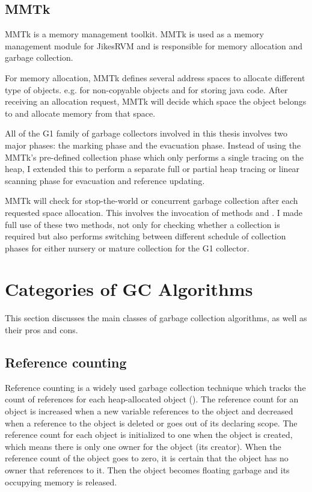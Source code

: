 \subsection{MMTk}

MMTk is a memory management toolkit.
MMTk is used as a memory management module for JikesRVM and is responsible for
memory allocation and garbage collection.

For memory allocation, MMTk defines several address spaces to
allocate different type of objects. e.g.  for non-copyable objects
and  for storing java code. After receiving an allocation request,
MMTk will decide which space the object belongs to and allocate memory from that space.

All of the G1 family of garbage collectors involved in this thesis involves two major phases:
the marking phase and the evacuation phase.
Instead of using the MMTk's pre-defined 
collection phase which only performs a single tracing on the heap, I extended this
to perform a separate full or partial heap tracing or linear scanning phase for
evacuation and reference updating.

MMTk will check for stop-the-world or concurrent garbage collection after each
requested space allocation.
This involves the invocation of methods 
and .
I made full use of these two methods,
not only for checking whether a collection is required but also performs switching between different schedule of collection phases
for either nursery or mature collection for the G1 collector.

\section{Categories of GC Algorithms}
\label{sec:gcalgorithms}

This section discusses the main classes of garbage collection algorithms, as well
as their pros and cons.

\subsection{Reference counting}

Reference counting is a widely used garbage collection technique which tracks the
count of references for each heap-allocated object (\cite{detlefs2002lock}).
The reference count for an object is increased when a new variable references to
the object and decreased when a reference
to the object is deleted or goes out of its declaring scope. The reference count for
each object is initialized to one when the object is created, which means there is only one
owner for the object (its creator). When the reference count of the object goes
to zero, it is certain that the object has no owner that references to it. Then the
object becomes floating garbage and its occupying memory is released.

